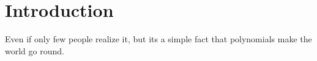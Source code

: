 

\section{Introduction}

Even if only few people realize it, but its a simple fact that polynomials make the world go round.